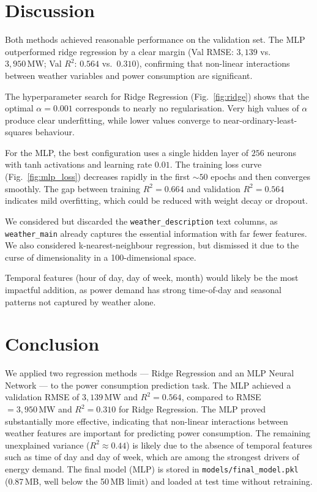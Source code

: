 \documentclass[a4, 10pt, conference]{ieeeconf}
\begin{document}
\section{Discussion}
\label{sec:discuss}

Both methods achieved reasonable performance on the validation set. The MLP outperformed ridge regression by a clear margin (Val RMSE: $3{,}139$ vs.\ $3{,}950\,\text{MW}$; Val $R^2$: $0.564$ vs.\ $0.310$), confirming that non-linear interactions between weather variables and power consumption are significant.

The hyperparameter search for Ridge Regression (Fig.~\ref{fig:ridge}) shows that the optimal $\alpha = 0.001$ corresponds to nearly no regularisation. Very high values of $\alpha$ produce clear underfitting, while lower values converge to near-ordinary-least-squares behaviour.

For the MLP, the best configuration uses a single hidden layer of $256$ neurons with tanh activations and learning rate $0.01$. The training loss curve (Fig.~\ref{fig:mlp_loss}) decreases rapidly in the first $\sim50$ epochs and then converges smoothly. The gap between training $R^2 = 0.664$ and validation $R^2 = 0.564$ indicates mild overfitting, which could be reduced with weight decay or dropout.

We considered but discarded the \texttt{weather\_description} text columns, as \texttt{weather\_main} already captures the essential information with far fewer features. We also considered k-nearest-neighbour regression, but dismissed it due to the curse of dimensionality in a 100-dimensional space.

Temporal features (hour of day, day of week, month) would likely be the most impactful addition, as power demand has strong time-of-day and seasonal patterns not captured by weather alone.

\section{Conclusion}
\label{sec:con}

We applied two regression methods — Ridge Regression and an MLP Neural Network — to the power consumption prediction task. The MLP achieved a validation RMSE of $3{,}139\,\text{MW}$ and $R^2 = 0.564$, compared to RMSE $= 3{,}950\,\text{MW}$ and $R^2 = 0.310$ for Ridge Regression. The MLP proved substantially more effective, indicating that non-linear interactions between weather features are important for predicting power consumption. The remaining unexplained variance ($R^2 \approx 0.44$) is likely due to the absence of temporal features such as time of day and day of week, which are among the strongest drivers of energy demand. The final model (MLP) is stored in \texttt{models/final\_model.pkl} (0.87\,MB, well below the 50\,MB limit) and loaded at test time without retraining.
\end{document}
